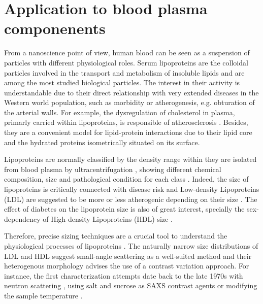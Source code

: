 



\section{Application to blood plasma componenents}

From a nanoscience point of view, human blood can be seen as a suspension of particles with different physiological roles. Serum lipoproteins are the colloidal particles involved in the transport and metabolism of insoluble lipids and are among the most studied biological particles. The interest in their activity is understandable due to their direct relationship with very extended diseases in the Western world population, such as morbidity or atherogenesis, e.g. obturation of the arterial walls. For example, the dysregulation of cholesterol in plasma, primarly carried within lipoproteins, is responsible of atherosclerosis \cite{munro_pathogenesis_1988}. Besides, they are a convenient model for lipid-protein interactions \cite{assmann_lipid-protein_1974} due to their lipid core and the hydrated proteins isometrically situated on its surface.

Lipoproteins are normally classified by the density range within they are isolated from blood plasma by ultracentrifugation \cite{havel_distribution_1955}, showing different chemical composition, size and pathological condition for each class \cite{german_lipoproteins:_2006}. Indeed, the size of lipoproteins is critically connected with disease risk \cite{gardner_cd_association_1996} and Low-density Lipoproteins (LDL) are suggested to be more or less atherogenic depending on their size \cite{dreon_low-density_1994}. The effect of diabetes on the lipoprotein size is also of great interest, specially the sex-dependency of High-density Lipoproteins (HDL) size \cite{colhoun_lipoprotein_2002}.

Therefore, precise sizing techniques are a crucial tool to understand the physiological processes of lipoproteins \cite{german_lipoproteins:_2006}. The naturally narrow size distributions of LDL and HDL suggest small-angle scattering as a well-suited method and their heterogenous morphology advises the use of a contrast variation approach. For instance, the first characterization attempts date back to the late 1970s with neutron scattering \cite{stuhrmann_neutron_1975}, using salt \cite{tardieu_structure_1976} and sucrose \cite{muller_structure_1978} as SAXS contrast agents or modifying the sample temperature \cite{laggner_molecular_1977,luzzati_structure_1979}. 

